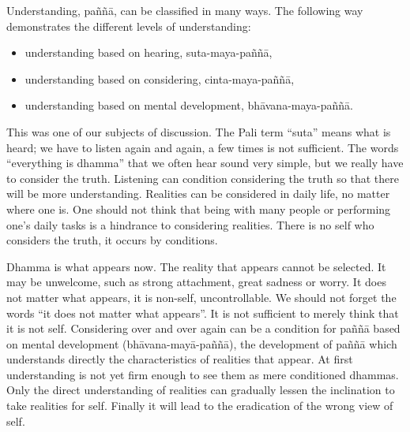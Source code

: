 Understanding, paññā, can be classified in many ways. The following way
demonstrates the different levels of understanding:

\begin{itemize}
\item
  understanding based on hearing, suta-maya-paññā,
\item
  understanding based on considering, cinta-maya-paññā,
\item
  understanding based on mental development, bhāvana-maya-paññā.
\end{itemize}

This was one of our subjects of discussion. The Pali term ``suta'' means
what is heard; we have to listen again and again, a few times is not
sufficient. The words ``everything is dhamma'' that we often hear sound
very simple, but we really have to consider the truth. Listening can
condition considering the truth so that there will be more
understanding. Realities can be considered in daily life, no matter
where one is. One should not think that being with many people or
performing one's daily tasks is a hindrance to considering realities.
There is no self who considers the truth, it occurs by conditions.

Dhamma is what appears now. The reality that appears cannot be selected.
It may be unwelcome, such as strong attachment, great sadness or worry.
It does not matter what appears, it is non-self, uncontrollable. We
should not forget the words ``it does not matter what appears''. It is
not sufficient to merely think that it is not self. Considering over and
over again can be a condition for paññā based on mental development
(bhāvana-mayā-paññā), the development of paññā which understands
directly the characteristics of realities that appear. At first
understanding is not yet firm enough to see them as mere conditioned
dhammas. Only the direct understanding of realities can gradually
lessen the inclination to take realities for self. Finally it will lead
to the eradication of the wrong view of self.



